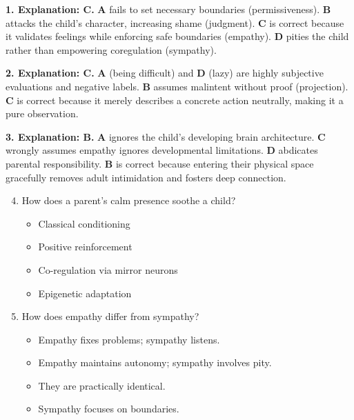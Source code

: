 \begin{practiceexercise}
\vspace{0.5cm}
\textbf{1. Explanation: C.} \textbf{A} fails to set necessary boundaries (permissiveness). \textbf{B} attacks the child's character, increasing shame (judgment). \textbf{C} is correct because it validates feelings while enforcing safe boundaries (empathy). \textbf{D} pities the child rather than empowering coregulation (sympathy).
\vspace{\fill}

\textbf{2. Explanation: C.} \textbf{A} (being difficult) and \textbf{D} (lazy) are highly subjective evaluations and negative labels. \textbf{B} assumes malintent without proof (projection). \textbf{C} is correct because it merely describes a concrete action neutrally, making it a pure observation.
\vspace{\fill}

\textbf{3. Explanation: B.} \textbf{A} ignores the child's developing brain architecture. \textbf{C} wrongly assumes empathy ignores developmental limitations. \textbf{D} abdicates parental responsibility. \textbf{B} is correct because entering their physical space gracefully removes adult intimidation and fosters deep connection.
\vspace{\fill}
\newpage

\begin{enumerate}
    \setcounter{enumi}{3}
    \item How does a parent's calm presence soothe a child?
    \begin{itemize}
        \item[A.] Classical conditioning
        \item[B.] Positive reinforcement
        \item[C.] Co-regulation via mirror neurons
        \item[D.] Epigenetic adaptation
    \end{itemize}
    \vspace{\fill}

    \item How does empathy differ from sympathy?
    \begin{itemize}
        \item[A.] Empathy fixes problems; sympathy listens.
        \item[B.] Empathy maintains autonomy; sympathy involves pity.
        \item[C.] They are practically identical.
        \item[D.] Sympathy focuses on boundaries.
    \end{itemize}
    \vspace{\fill}


\end{enumerate}
\end{practiceexercise}
